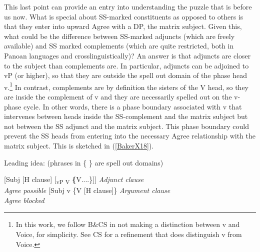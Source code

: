 \documentclass[output=paper,colorlinks,citecolor=brown,
]{langscibook}
\begin{document}
This last point can provide an entry into understanding the puzzle that is before us now. What is special about SS-marked constituents as opposed to others is that they enter into upward Agree with a DP, the matrix subject. Given this, what could be the difference between SS-marked adjuncts (which are freely available) and SS marked complements (which are quite restricted, both in Panoan languages and crosslinguistically)? An answer is that adjuncts are closer to the subject than complements are. In particular, adjuncts can be adjoined to vP (or higher), so that they are outside the spell out domain of the phase head v.\footnote{In this work, we follow B\&CS in not making a distinction between v and Voice, for simplicity. See CS for a refinement that does distinguish v from Voice.} In contrast, complements are by definition the sisters of the V head, so they are inside the complement of v and they are necessarily spelled out on the v-phase cycle. In other words, there is a phase boundary associated with v that intervenes between heads inside the SS-complement and the matrix subject but not between the SS adjunct and the matrix subject. This phase boundary could prevent the SS heads from entering into the necessary Agree relationship with the matrix subject. This is sketched in (\ref{BakerX18}).

\newpage

\begin{exe}
    \ex Leading idea: (phrases in \{ \} are spell out domains) \label{BakerX18}
	    \begin{xlist}
			\ex \label{BakerX18a}
			    [Subj [H clause] [\textsubscript{vP V} \textbf\{V....\}]] \textit{Adjunct clause}
		           	\\
		           	\hspace*{3.5em} \textit{Agree possible}
			    \vspace{8pt}
			\ex \label{BakerX18b}
			    [Subj v \{V [H clause]\} \textit{Argument clause}
		        	\\
		        	\hspace*{5.3em} \textit{Agree blocked}
		    	\vspace{12pt}
		\end{xlist}
\end{exe}
\end{document}
